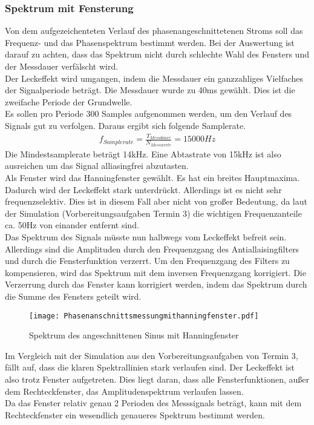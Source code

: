 \documentclass{article}%
\begin{document}
\subsubsection{Spektrum mit Fensterung}
Von dem aufgezeichenteten Verlauf des phasenangeschnittetenen Stroms soll das Frequenz- und das Phasenspektrum bestimmt werden. Bei der Auswertung ist darauf zu achten, dass das Spektrum nicht durch schlechte Wahl des Fensters und der Messdauer verfälscht wird.\\ Der Leckeffekt wird umgangen, indem die Messdauer ein ganzzahliges Vielfaches der Signalperiode beträgt. Die Messdauer wurde zu 40ms gewählt. Dies ist die zweifache Periode der Grundwelle.\\ Es sollen pro Periode 300 Samples aufgenommen werden, um den Verlauf des Signals gut zu verfolgen. Daraus ergibt sich folgende Samplerate.
\begin{align}
f_{Samplerate} = \frac{T_{Messdauer}}{N_{Messwerte}} = 15000Hz
\end{align} 
Die Mindestsamplerate beträgt 14kHz. Eine Abtastrate von 15kHz ist also ausreichen um das Signal alliasingfrei abzutasten.\\Als Fenster wird das Hanningfenster gewählt. Es hat ein breites Hauptmaxima. Dadurch wird der Leckeffekt stark unterdrückt. Allerdings ist es nicht sehr frequenzselektiv. Dies ist in diesem Fall aber nicht von großer Bedeutung, da laut der Simulation (Vorbereitungsaufgaben Termin 3) die wichtigen Frequenzanteile ca. 50Hz von einander entfernt sind.\\ Das Spektrum des Signals müsste nun halbwegs vom Leckeffekt befreit sein. Allerdings sind die Amplituden durch den Frequenzgang des Antiallaisingfilters und durch die Fensterfunktion verzerrt. Um den Frequenzgang des Filters zu kompensieren, wird das Spektrum mit dem inversen Frequenzgang korrigiert. Die Verzerrung durch das Fenster kann korrigiert werden, indem das Spektrum durch die Summe des Fensters geteilt wird.\\
\begin{figure}[htb]
\centering
\texttt{[image: Phasenanschnittsmessungmithanningfenster.pdf]}
\caption{Spektrum des angeschnittenen Sinus mit Hanningfenster}
\end{figure} 
Im Vergleich mit der Simulation aus den Vorbereitungsaufgaben von Termin 3, fällt auf, dass die klaren Spektrallinien stark verlaufen sind. Der Leckeffekt ist also trotz Fenster aufgetreten. Dies liegt daran, dass alle Fensterfunktionen, außer dem Rechteckfenster, das Amplitudenspektrum verlaufen lassen.\\ Da das Fenster relativ genau 2 Perioden des Messsignals beträgt, kann mit dem Rechteckfenster ein wesendlich genaueres Spektrum bestimmt werden.\\ 
\end{document}
